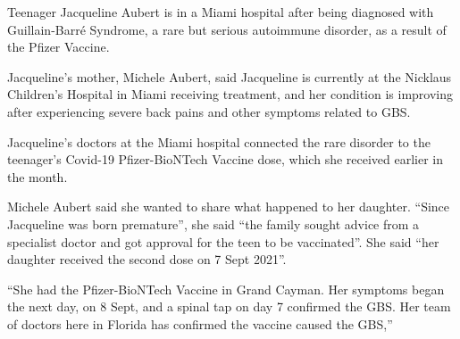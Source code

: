 Teenager Jacqueline Aubert is in a Miami hospital after being diagnosed with
Guillain-Barré Syndrome, a rare but serious autoimmune disorder, as a result of
the Pfizer Vaccine.

Jacqueline’s mother, Michele Aubert, said Jacqueline is currently at the
Nicklaus Children’s Hospital in Miami receiving treatment, and her condition is
improving after experiencing severe back pains and other symptoms related to
GBS.

Jacqueline’s doctors at the Miami hospital connected the rare disorder to the
teenager’s Covid-19 Pfizer-BioNTech Vaccine dose, which she received earlier in
the month.

Michele Aubert said she wanted to share what happened to her daughter. “Since
Jacqueline was born premature”, she said “the family sought advice from a
specialist doctor and got approval for the teen to be vaccinated”. She said ``her
daughter received the second dose on 7 Sept 2021''.

“She had the Pfizer-BioNTech Vaccine in Grand Cayman. Her symptoms began the
next day, on 8 Sept, and a spinal tap on day 7 confirmed the GBS. Her team of
doctors here in Florida has confirmed the vaccine caused the GBS,”
